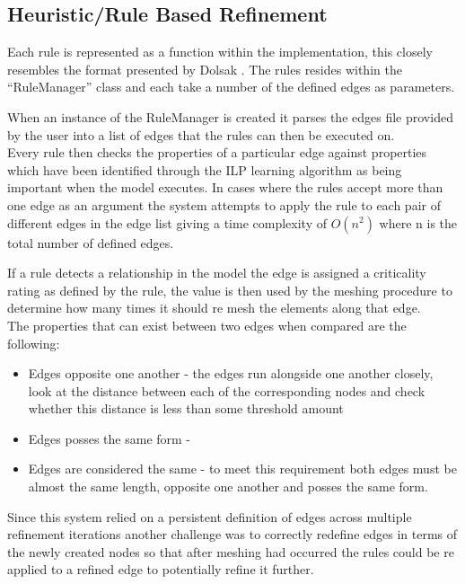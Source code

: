 \subsection{Heuristic/Rule Based Refinement}
Each rule is represented as a function within the implementation, this closely resembles the format presented by Dolsak \cite{DolsakPaper91, DolsakPaper94, appOfILPToFEMeshDesign} \cite{ConsultRuleIntelltSystemFE}. The rules resides within the ``RuleManager'' class and each take a number of the defined edges as parameters. 

When an instance of the RuleManager is created it parses the edges file provided by the user into a list of edges that the rules can then be executed on. \\ 

Every rule then checks the properties of a particular edge against properties which have been identified through the ILP learning algorithm as being important when the model executes. In cases where the rules accept more than one edge as an argument the system attempts to apply the rule to each pair of different edges in the edge list giving a time complexity of $O(n^2)$ where n is the total number of defined edges. 

If a rule detects a relationship in the model the edge is assigned a criticality rating as defined by the rule, the value is then used by the meshing procedure to determine how many times it should re mesh the elements along that edge. \\ 
 
The properties that can exist between two edges when compared are the following:
\begin{itemize}
\item Edges opposite one another - the edges run alongside one another closely, look at the distance between each of the corresponding nodes and check whether this distance is less than some threshold amount
\item Edges posses the same form - 

\item Edges are considered the same - to meet this requirement both edges must be almost the same length, opposite one another and posses the same form.

\end{itemize}

Since this system relied on a persistent definition of edges across multiple refinement iterations another challenge was to correctly redefine edges in terms of the newly created nodes so that after meshing had occurred the rules could be re applied to a refined edge to potentially refine it further.

